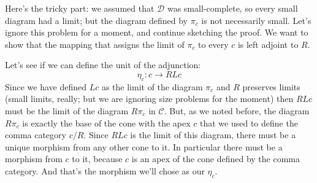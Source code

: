 \documentclass[11pt]{amsart}
\begin{document}
Here's the tricky part: we assumed that $\mathcal D$ was small-complete, so every small diagram had a limit; but the diagram defined by $\pi_c$ is not necessarily small. Let's ignore this problem for a moment, and continue sketching the proof. We want to show that the mapping that assigns the limit of $\pi_c$ to every $c$ is left adjoint to $R$. 

Let's see if we can define the unit of the adjunction:
\[ \eta_c : c \to R L c\]
Since we have defined $L c$ as the limit of the diagram $\pi_c$ and $R$ preserves limits (small limits, really; but we are ignoring size problems for the moment) then $R L c$ must be the limit of the diagram $R \pi_c$ in $\mathcal C$. But, as we noted before, the diagram  $R \pi_c$ is exactly the base of the cone with the apex $c$ that we used to define the comma category $c/R$. Since $R L c$ is the limit of this diagram, there must be a unique morphism from any other cone to it. In particular there must be a morphism from $c$ to it, because $c$ is an apex of the cone defined by the comma category. And that's the morphism we'll chose as our $\eta_c$. 
\end{document}
